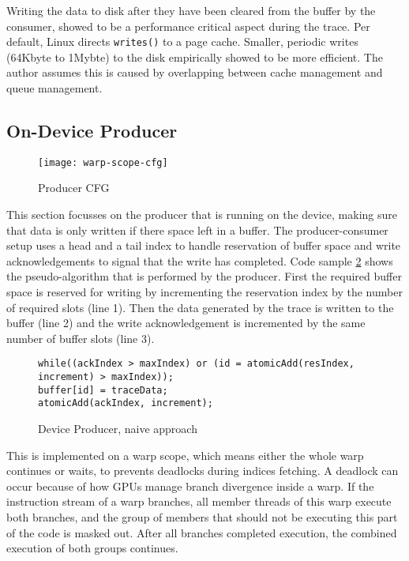 	Writing the data to disk after they have been cleared from the buffer by the consumer, showed to be a performance critical aspect during the trace. Per default, Linux directs \verb|writes()| to a page cache. Smaller, periodic writes (64Kbyte to 1Mybte) to the disk empirically showed to be more efficient. The author assumes this is caused by overlapping between cache management and queue management.
	
	\subsection{On-Device Producer}\label{ondevprod}
\begin{figure}[t]
	\centering
	\texttt{[image: warp-scope-cfg]}
	\caption{Producer CFG}
\label{wscfg}
\end{figure}	
	This section focusses on the producer that is running on the device, making sure that data is only written if there space left
	in a buffer. The producer-consumer setup uses a head and a tail index to handle reservation of buffer space and write acknowledgements to signal that the write has completed. Code sample \ref{prod-cons} shows the pseudo-algorithm that is performed by the producer. First the required buffer space is reserved for writing by incrementing the reservation index
	by the number of required slots (line 1). Then the data generated by the trace is
	written to the buffer (line 2) and the write acknowledgement is incremented by the same number of buffer slots (line 3).
\begin{figure}
	\begin{lstlisting}[style=C]
while((ackIndex > maxIndex) or (id = atomicAdd(resIndex, increment) > maxIndex));
buffer[id] = traceData;
atomicAdd(ackIndex, increment);
\end{lstlisting}
	\caption{Device Producer, naive approach}
	\label{prod-cons}
\end{figure}

	
	This is implemented on a warp scope, which means either the whole warp continues or waits, to prevents deadlocks during indices fetching.
	A deadlock can occur because of how GPUs manage branch divergence inside a warp. If the instruction stream of a warp branches, all member threads of this warp execute both branches, and the group of members that should not be executing this part of the code is masked out. After all branches completed execution, the combined execution of both groups continues.
	

